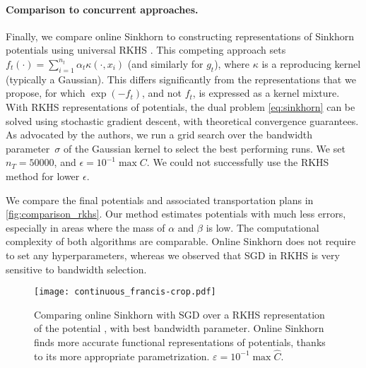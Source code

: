 \paragraph{Comparison to concurrent approaches.}\label{sec:compare}Finally, we compare online
Sinkhorn to constructing representations of Sinkhorn potentials using universal
RKHS \citep{2016-genevay-nips}. This competing approach sets $f_t(\cdot) =
\sum_{i=1}^{n_t} \alpha_t \kappa(\cdot, x_i)$ (and similarly for $g_t$), where $\kappa$ is
a reproducing kernel (typically a Gaussian). This differs significantly from the
representations that we propose, for which $\exp(-f_t)$, and not $f_t$, is
expressed as a kernel mixture. 
%
With RKHS representations of potentials, the
dual problem \eqref{eq:sinkhorn} can be solved using stochastic gradient
descent, with theoretical convergence guarantees. As advocated by the authors,
we run a grid search over the bandwidth parameter~$\sigma$ of the Gaussian kernel to select the best
performing runs. We set $n_T = 50000$, and $\epsilon = 10^{-1} \max C$. We could not successfully use the RKHS method for lower $\epsilon$.

We compare the final potentials and associated transportation plans in
\autoref{fig:comparison_rkhs}. Our method estimates potentials with much less
errors, especially in areas where the mass of $\alpha$ and $\beta$ is low. The
computational complexity of both algorithms are comparable. Online Sinkhorn does
not require to set any hyperparameters, whereas we observed that SGD in RKHS is very
sensitive to bandwidth selection.

\begin{figure}[t]
    \centering
    \texttt{[image: continuous\_francis-crop.pdf]}
    \caption{Comparing online Sinkhorn with SGD over a RKHS representation of the potential \citep{2016-genevay-nips}, with best bandwidth parameter. Online Sinkhorn finds more accurate functional representations of potentials, thanks to its more appropriate parametrization. $\varepsilon = 10^{-1} \max \hat C$.}
    \label{fig:comparison_rkhs}
\end{figure}